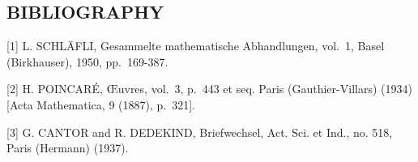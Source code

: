 \subsection*{BIBLIOGRAPHY}

{[}1{]} L. SCHLÄFLI, Gesammelte mathematische Abhandlungen, vol.~1, Basel (Birkhauser), 1950, pp.~169-387.

{[}2{]} H. POINCARÉ, Œuvres, vol.~3, p.~443 et seq. Paris (Gauthier-Villars) (1934) {[}Acta Mathematica, 9 (1887), p.~321{]}.

{[}3{]} G. CANTOR and R. DEDEKIND, Briefwechsel, Act. Sci. et Ind., no. 518, Paris (Hermann) (1937).

